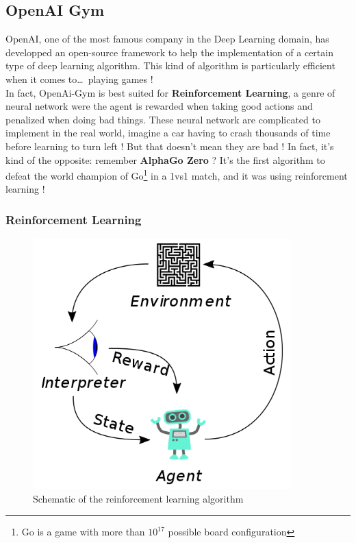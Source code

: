 \clearpage
\subsection{OpenAI Gym}

\begin{figure}[!h]
    \centering
    \def\svgwidth{0.7\columnwidth}
    
\end{figure}

OpenAI, one of the most famous company in the Deep Learning domain, has developped an open-source framework to help the implementation of a certain type of deep learning algorithm. This kind of algorithm is particularly efficient when it comes to\dots~playing games !\\

In fact, OpenAi-Gym is best suited for \textbf{Reinforcement Learning}, a genre of neural network were the agent is rewarded when taking good actions and penalized when doing bad things. These neural network are complicated to implement in the real world, imagine a car having to crash thousands of time before learning to turn left ! But that doesn't mean they are bad ! In fact, it's kind of the opposite: remember \textbf{AlphaGo Zero} ? It's the first algorithm to defeat the world champion of Go\footnote{Go is a game with more than $10^{17}$ possible board configuration\cite{AlphaGo}} in a 1vs1 match, and it was using reinforcment learning !\\

\subsubsection*{Reinforcement Learning}
\begin{figure}[!h]
\centering
\includegraphics[width=10cm]{img/Reinforcement_learning_diagram.png}
\caption{Schematic of the reinforcement learning algorithm}
\end{figure}
\clearpage


